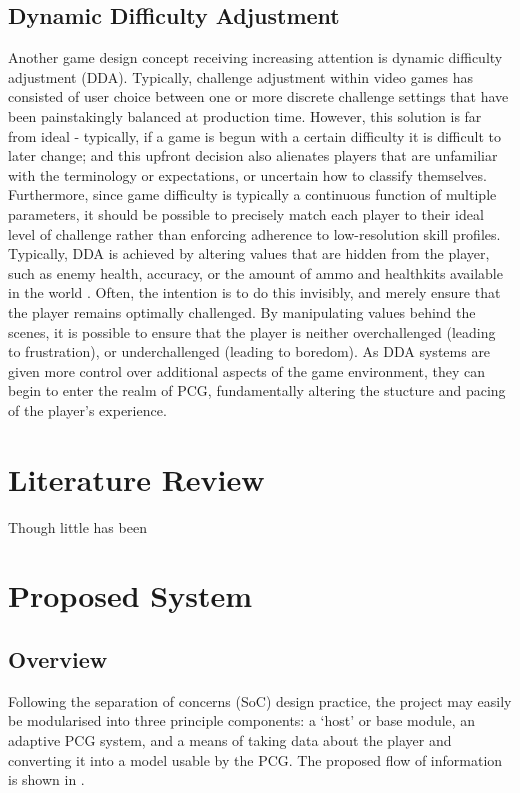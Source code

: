 \documentclass[a4paper,oneside,12pt,openany]{memoir}
\begin{document}
\section{Dynamic Difficulty Adjustment}
Another game design concept receiving increasing attention is dynamic difficulty adjustment (DDA). Typically, challenge adjustment within video games has consisted of user choice between one or more discrete challenge settings that have been painstakingly balanced at production time. However, this solution is far from ideal - typically, if a game is begun with a certain difficulty it is difficult to later change; and this upfront decision also alienates players that are unfamiliar with the terminology or expectations, or uncertain how to classify themselves\cite{5765665}. Furthermore, since game difficulty is typically a continuous function of multiple parameters, it should be possible to precisely match each player to their ideal level of challenge rather than enforcing adherence to low-resolution skill profiles. Typically, DDA is achieved by altering values that are hidden from the player, such as enemy health, accuracy, or the amount of ammo and healthkits available in the world \cite{hamlet}. Often, the intention is to do this invisibly, and merely ensure that the player remains optimally challenged. By manipulating values behind the scenes, it is possible to ensure that the player is neither overchallenged (leading to frustration), or underchallenged (leading to boredom)\cite{flow}. As DDA systems are given more control over additional aspects of the game environment, they can begin to enter the realm of PCG, fundamentally altering the stucture and pacing of the player's experience. 



\chapter{Literature Review}
Though little has been
\section{}
\chapter{Proposed System}
\section{Overview}
Following the separation of concerns (SoC) design practice, the project may easily be modularised into three principle components: a `host' or base module, an adaptive PCG system, and a means of taking data about the player and converting it into a model usable by the PCG. The proposed flow of information is shown in .
\end{document}

